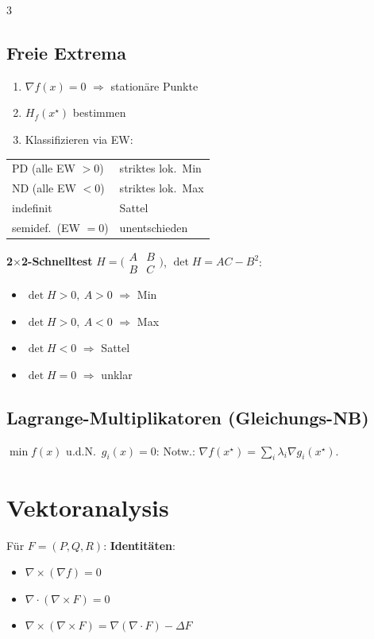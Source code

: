 \documentclass[8pt,a4paper]{extarticle}
\begin{document}
\begin{multicols*}{3}
\subsection{Freie Extrema}
\begin{enumerate}
\item $\nabla f(x){=}0$ $\Rightarrow$ station\"are Punkte
\item $H_f(x^\star)$ bestimmen
\item Klassifizieren via EW:
\end{enumerate}
\begin{tabularx}{\linewidth}{@{}l@{\ }X@{}}
PD (alle EW $>0$) & striktes lok.\ Min \\
ND (alle EW $<0$) & striktes lok.\ Max \\
indefinit & Sattel \\
semidef.\ (EW $=0$) & unentschieden \\
\end{tabularx}
\textbf{2$\times$2-Schnelltest} $H=\bigl(\begin{smallmatrix}A&B\\B&C\end{smallmatrix}\bigr)$, $\det H{=}AC{-}B^2$:
\begin{itemize}
\item $\det H>0,\ A>0$ $\Rightarrow$ Min
\item $\det H>0,\ A<0$ $\Rightarrow$ Max
\item $\det H<0$ $\Rightarrow$ Sattel
\item $\det H=0$ $\Rightarrow$ unklar
\end{itemize}

\subsection{Lagrange-Multiplikatoren (Gleichungs-NB)}
$\min f(x)$ u.d.N.\ $g_i(x){=}0$:
Notw.: $\nabla f(x^\star)=\sum_i \lambda_i \nabla g_i(x^\star)$.

\section{Vektoranalysis}
F\"ur $F=(P,Q,R)$:
\textbf{Identit\"aten}:
\begin{itemize}
\item $\nabla\times(\nabla f)=0$
\item $\nabla\cdot(\nabla\times F)=0$
\item $\nabla\times(\nabla\times F)=\nabla(\nabla\cdot F)-\Delta F$
\end{itemize}


\end{multicols*}
\end{document}
